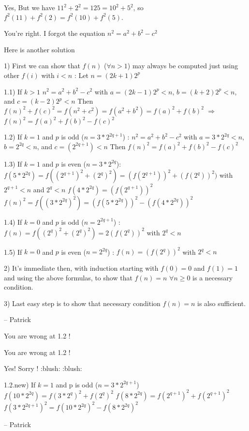 \begin{mysolution}
	\begin{tcolorbox}Yes, But we have $11^{2}+2^{2}=125=10^{2}+5^{2}$, so $f^{2}(11)+f^{2}(2)=f^{2}(10)+f^{2}(5)$.\end{tcolorbox}
You're right. I forgot the equation $n^{2}=a^{2}+b^{2}-c^{2}$

Here is another solution

1) First we can show that $f(n)$ ($\forall n>1$) may always be computed just using other $f(i)$ with $i<n$   :   Let $n=(2k+1)2^{p}$

1.1) If $k>1$ $n^{2}=a^{2}+b^{2}-c^{2}$ with $a=(2k-1)2^{p}<n$, $b=(k+2)2^{p}<n$, and $c=(k-2)2^{p}<n$
Then $f(n)^{2}+f(c)^{2}=f(n^{2}+c^{2})=f(a^{2}+b^{2})=f(a)^{2}+f(b)^{2}$ $\Rightarrow $ $f(n)^{2}=f(a)^{2}+f(b)^{2}-f(c)^{2}$

1.2) If $k=1$ and $p$ is odd ($n=3*2^{2q+1}$) : $n^{2}=a^{2}+b^{2}-c^{2}$ with  $a=3*2^{2q}<n$,  $b=2^{2q}<n$,  and  $c=(2^{2q+1})<n$
Then $f(n)^{2}=f(a)^{2}+f(b)^{2}-f(c)^{2}$

1.3) If $k=1$ and $p$ is even ($n=3*2^{2q}$):
$f(5*2^{2q}) = f((2^{q+1})^{2}+(2^{q})^{2}) = (f(2^{q+1}))^{2}+(f(2^{q}))^{2})$  with  $2^{q+1}<n$  and  $2^{q}<n$
$f(4*2^{2q}) = (f(2^{q+1}))^{2}$
$f(n)^{2}= f((3*2^{2q})^{2})= (f(5*2^{2q}))^{2}-(f(4*2^{2q}) )^{2}$

1.4) If $k=0$ and $p$ is odd ($n=2^{2q+1}$) :
$f(n)=f((2^{q})^{2}+(2^{q})^{2}) = 2(f(2^{q}))^{2}$  with  $2^{q}<n$

1.5) If $k=0$ and $p$ is even ($n=2^{2q}$) :
$f(n) = (f(2^{q}))^{2}$  with  $2^{q}< n$

2) It's immediate then, with induction starting with $f(0)=0$ and $f(1)=1$ and using the above formulas, to show that $f(n)=n$ $\forall n\geq 0$ is a necessary condition.

3) Last easy step is to show that necessary condition $f(n)=n$ is also sufficient.

-- 
Patrick
\end{mysolution}



\begin{mysolution}
	You are wrong at 1.2 !
\end{mysolution}



\begin{mysolution}
	\begin{tcolorbox}You are wrong at 1.2 !\end{tcolorbox}

Yes! Sorry !  :blush:  :blush: 

1.2.new) If $k=1$ and p is odd ($n=3*2^{2q+1}$)
$f(10*2^{2q})=f(3*2^{q})^{2}+f(2^{q})^{2}$
$f(8*2^{2q})=f(2^{q+1})^{2}+f(2^{q+1})^{2}$
$f(3*2^{2q+1})^{2}=f(10*2^{2q})^{2}-f(8*2^{2q})^{2}$

-- 
Patrick
\end{mysolution}



